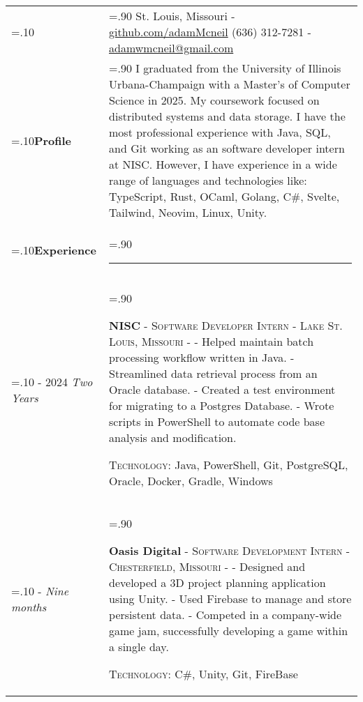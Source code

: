 \documentclass[10pt]{article}
\newcommand{\timeFrame}[3] {
  \if\relax\detokenize{#2}\relax
    #1
  \else
    #1 - #2
  \fi
  \newline
  \scriptsize \textit{#3}
}
\newcommand{\entry}[6] {
  \textbf{#1}
  \if\relax\detokenize{#2}\relax
  \else
       - \textsc{#2}
  \fi
  \if\relax\detokenize{#3}\relax
  \else
      - \textsc{#3}
  \fi
  \if\relax\detokenize{#4}\relax
  \else
      - \href{https://#4}{#4}
  \fi
  \newline #5
  \if\relax\detokenize{#6}\relax
  \else
      \newline \textsc{Technology:} #6
  \fi
  \\
}
\newcommand{\horizontalLine}[0] {
    \noindent\rule{.90\linewidth}{0.4pt}
}
\begin{document}

\begin{tabularx}{\linewidth}{>{\hsize=.10\hsize}X>{\hsize=.90\hsize}X}

{\bfseries\large Adam McNeil} &
St. Louis, Missouri - \href{https://github.com/adamMcneil}{github.com/adamMcneil}\newline
{(636) 312-7281 \hspace{5.5mm} - \href{mailto:adamwmcneil@gmail.com}{adamwmcneil@gmail.com}} \\[5pt]

\textbf{Profile} &
{
  I graduated from the University of Illinois Urbana-Champaign with a Master's of Computer Science in 2025.
  My coursework focused on distributed systems and data storage.
  I have the most professional experience with Java, SQL, and Git working as an software developer intern at NISC.
  However, I have experience in a wide range of languages and technologies like: TypeScript, Rust, OCaml, Golang, C\#, Svelte, Tailwind, Neovim, Linux, Unity.
} \\

\textbf{Experience} & \horizontalLine \\

\timeFrame{2023}{2024}{Two Years} &
\entry{NISC}
  {Software Developer Intern}
  {Lake St. Louis, Missouri}
  {}
  {
  - Helped maintain batch processing workflow written in Java. \newline
  - Streamlined data retrieval process from an Oracle database. \newline
  - Created a test environment for migrating to a Postgres Database. \newline
  - Wrote scripts in PowerShell to automate code base analysis and modification.
  }
  {Java, PowerShell, Git, PostgreSQL, Oracle, Docker, Gradle, Windows \newline}

\timeFrame{2022}{}{Nine months} &
\entry{Oasis Digital}
  {Software Development Intern}
  {Chesterfield, Missouri}
  {}
  {
  - Designed and developed a 3D project planning application using Unity. \newline
  - Used Firebase to manage and store persistent data. \newline
  - Competed in a company-wide game jam, successfully developing a game within a single day.
  }
  {C\#, Unity, Git, FireBase}



\end{tabularx}
\end{document}
